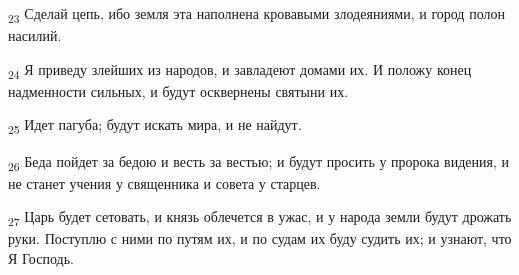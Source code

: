 \begin{tcolorbox}
\textsubscript{23} Сделай цепь, ибо земля эта наполнена кровавыми злодеяниями, и город полон насилий.
\end{tcolorbox}
\begin{tcolorbox}
\textsubscript{24} Я приведу злейших из народов, и завладеют домами их. И положу конец надменности сильных, и будут осквернены святыни их.
\end{tcolorbox}
\begin{tcolorbox}
\textsubscript{25} Идет пагуба; будут искать мира, и не найдут.
\end{tcolorbox}
\begin{tcolorbox}
\textsubscript{26} Беда пойдет за бедою и весть за вестью; и будут просить у пророка видения, и не станет учения у священника и совета у старцев.
\end{tcolorbox}
\begin{tcolorbox}
\textsubscript{27} Царь будет сетовать, и князь облечется в ужас, и у народа земли будут дрожать руки. Поступлю с ними по путям их, и по судам их буду судить их; и узнают, что Я Господь.
\end{tcolorbox}
